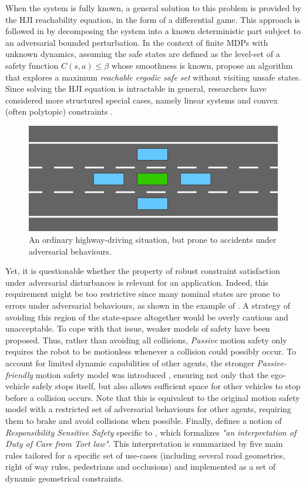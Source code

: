 When the system is fully known, a general solution to this problem is provided by the \gls{HJI} reachability equation, in the form of a differential game. This approach is followed in \citep{leung2018infusing,Fisac2019} by decomposing the system into a known deterministic part subject to an adversarial bounded perturbation. In the context of finite \glspl{MDP} with unknown dynamics, 
assuming the safe states are defined as the level-set of a safety function  $C(s,a) \leq \beta$ whose smoothness is known, \citet{Turchetta2016} propose an algorithm that explores a maximum \emph{reachable ergodic safe set} without visiting unsafe states.
Since solving the \gls{HJI} equation is intractable in general, researchers have considered more structured special cases, namely linear systems and convex (often polytopic) constraints \citep{Fukushima2007,Adetola2009,Aswani2013,Lorenzen2017,Kohler2019,Lu2019}.

\begin{figure}[ht]
	\centering
	\includegraphics[width=0.45\linewidth]{img/safety_no_2_small}
	\caption{An ordinary highway-driving situation, but prone to accidents under adversarial behaviours.}
	\label{fig:no-safety}
\end{figure}
Yet, it is questionable whether the property of robust constraint satisfaction under adversarial disturbances is relevant for an  application. Indeed, this requirement might be too restrictive since many nominal states are prone to errors under adversarial behaviours, as shown in the example of . A strategy of avoiding this region of the state-space altogether would be overly cautious and unacceptable. To cope with that issue, weaker models of safety have been proposed. Thus, rather than avoiding all collisions, \emph{Passive} motion safety \citep{Macek2009,Bouraine2012,Bouraine2014} only requires the robot to be motionless whenever a collision could possibly occur. To account for limited dynamic capabilities of other agents, the stronger \emph{Passive-friendly} motion safety model was introduced \citep{Mitsch2017}, ensuring not only that the ego-vehicle safely stops itself, but also allows sufficient space for other vehicles to stop before a collision occurs. Note that this is equivalent to the original motion safety model with a restricted set of adversarial behaviours for other agents, requiring them to brake and avoid collisions when possible. Finally, \citet{ShalevShwartz2017} defines a notion of \emph{Responsibility Sensitive Safety} specific to , which formalizes \emph{"an interpretation of \emph{Duty of Care} from Tort law"}. This interpretation is summarized by five main rules tailored for a specific set of use-cases (including several road geometries, right of way rules, pedestrians and occlusions) and implemented as a set of dynamic geometrical constraints.

